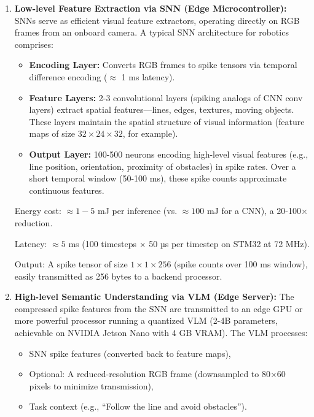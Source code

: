 \begin{enumerate}
    
\item \textbf{Low-level Feature Extraction via SNN (Edge Microcontroller):}
    SNNs serve as efficient visual feature extractors, operating directly on RGB frames from an onboard camera. 
    A typical SNN architecture for robotics comprises:
    \begin{itemize}
        \item \textbf{Encoding Layer:} Converts RGB frames to spike tensors via temporal difference encoding 
        ($\approx$ 1 ms latency).
        
        \item \textbf{Feature Layers:} 2-3 convolutional layers (spiking analogs of CNN conv layers) extract 
        spatial features—lines, edges, textures, moving objects. These layers maintain the spatial structure 
        of visual information (feature maps of size $32 \times 24 \times 32$, for example).
        
        \item \textbf{Output Layer:} 100-500 neurons encoding high-level visual features (e.g., line position, 
        orientation, proximity of obstacles) in spike rates. Over a short temporal window (50-100 ms), these 
        spike counts approximate continuous features.
    \end{itemize}
    
    Energy cost: $\approx 1-5$ mJ per inference (vs. $\approx 100$ mJ for a CNN), a 20-100× reduction.
    
    Latency: $\approx 5$ ms (100 timesteps × 50 µs per timestep on STM32 at 72 MHz).
    
    Output: A spike tensor of size $1 \times 1 \times 256$ (spike counts over 100 ms window), easily transmitted 
    as 256 bytes to a backend processor.

    
\item \textbf{High-level Semantic Understanding via VLM (Edge Server):}
    The compressed spike features from the SNN are transmitted to an edge GPU or more powerful processor running 
    a quantized VLM (2-4B parameters, achievable on NVIDIA Jetson Nano with 4 GB VRAM). The VLM processes:
    \begin{itemize}
        \item SNN spike features (converted back to feature maps),
        \item Optional: A reduced-resolution RGB frame (downsampled to 80×60 pixels to minimize transmission),
        \item Task context (e.g., ``Follow the line and avoid obstacles'').
    \end{itemize}
    

\end{enumerate}

